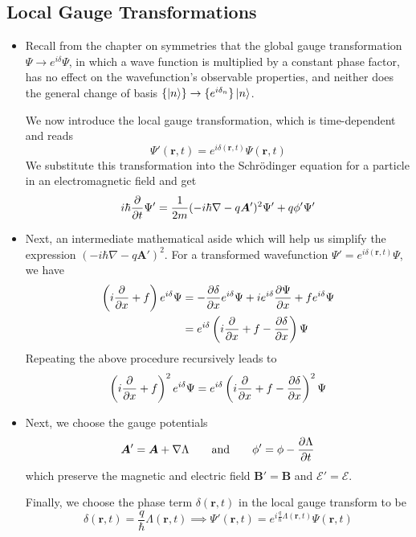\documentclass[11pt, a4paper]{article}
\renewcommand{\grad}{\nabla}
\newcommand{\eqtext}[1]{\qquad \text{#1} \qquad}
\newcommand{\Schro}{Schr\"{o}dinger\xspace}
\renewcommand{\vec}[1]{\bm{#1}}  %
\renewcommand{\r}{\vec{r}}  %
\newcommand{\A}{\vec{A}}  %
\newcommand{\B}{\vec{B}}  %
\renewcommand{\P}{\Psi}  %
\begin{document}
\subsection{Local Gauge Transformations}
\begin{itemize}
	\item Recall from the chapter on symmetries that the global gauge transformation $ \P \to e^{i\delta}\P $, in which a wave function is multiplied by a constant phase factor, has no effect on the wavefunction's observable properties, and neither does the general change of basis $ \{\ket{n}\} \to \{e^{i\delta_{n}}\}\ket{n}$. 
	
	We now introduce the local gauge transformation, which is time-dependent and reads
	\begin{equation*}
		\P'(\r, t) = e^{i\delta (\r, t)} \P(\r, t)
	\end{equation*}
	We substitute this transformation into the \Schro equation for a particle in an electromagnetic field and get
	\begin{equation*}
		i\hbar \pdv{t}\P' = \frac{1}{2m}(-i\hbar \grad - q\A')^{2}\P' + q \phi' \P'
	\end{equation*}
	
	\item Next, an intermediate mathematical aside which will help us simplify the expression $ (-i\hbar \grad - q\A')^{2} $. For a transformed wavefunction $ \P' = e^{i\delta(\r, t)}\P $, we have
	\begin{align*}
		\left(i\pdv{x} + f\right)e^{i\delta}\P &= - \pdv{\delta}{x} e^{i\delta }\P + ie^{i\delta}\pdv{\P}{x} + fe^{i\delta}\P\\
		& = e^{i\delta}\left(i \pdv{x} + f - \pdv{\delta}{x}\right)\P
	\end{align*}
	Repeating the above procedure recursively leads to
	\begin{equation*}
		\left(i\pdv{x} + f\right)^{2}e^{i\delta}\P = e^{i\delta}\left(i \pdv{x} + f - \pdv{\delta}{x}\right)^{2}\P 
	\end{equation*}
	
	\item Next, we choose the gauge potentials
	\begin{equation*}
		\A' = \A + \grad \Lambda \eqtext{and} \phi' = \phi - \pdv{\Lambda}{t}
	\end{equation*}
	which preserve the magnetic and electric field $ \B' = \B $ and $ \vec{\mathcal{E}}' = \vec{\mathcal{E}} $.
	
	Finally, we choose the phase term $ \delta(\r, t) $ in the local gauge transform to be
	\begin{equation*}
		\delta(\r, t) = \frac{q}{\hbar}\Lambda(\r, t) \implies \P'(\r, t) = e^{i\frac{q}{\hbar}\Lambda(\r, t)} \P(\r, t)
	\end{equation*}
	

\end{itemize}
\end{document}
